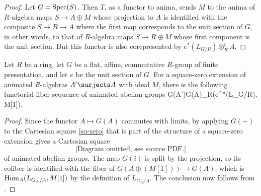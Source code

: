 \begin{proof} Let $G=\operatorname{Spec}(S)$. Then $T$, as a functor to anima, sends $M$ to the anima of $R$-algebra maps $S\to A\oplus M$ whose projection to $A$ is identified with the composite $S\to R\to A$ where the first map corresponds to the unit section of $G$, in other words, to that of $R$-algebra maps $S\to R\oplus M$ whose first component is the unit section. But this functor is also corepresented by $e^\ast(L_{G/R})\otimes_R^{\mathbb L} A$.
\end{proof}









\bthm\label{cor:deftheorygroup}
Let $R$ be a ring, let $G$ be a flat, affine, commutative $R$-group of finite presentation, and let $e$ be the unit section of $G$. For a square-zero extension of animated $R$-algebras $A'\surjects A$ with ideal $M$,
 there is the following functorial fiber sequence of animated abelian groups\uc
\be \label{eqn:def-thy-basic}
G(A')\to G(A)\to \Hom_R(e^*(L_{G/R}), M[1]).
\ee
\ethm

\begin{proof} %
Since the functor $A\mapsto G(A)$ commutes with limits, by applying $G(-)$ to the Cartesian square \eqref{sq-zero} that is part of the structure of a square-zero extension gives a Cartesian square
\[
\text{[Diagram omitted; see source PDF.]}\]
of animated abelian groups. The map $G(i)$ is split by the projection, so its cofiber is identified with the fiber of $G(A\oplus (M[1]))\to G(A)$, which is $\operatorname{Hom}_A(L_{G_A/A},M[1])$ by the definition of $L_{G_A/A}$. The conclusion now follows from . %
\end{proof}



